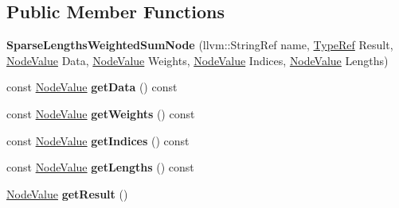 \subsection*{Public Member Functions}
\begin{DoxyCompactItemize}
\item 
\mbox{\label{classglow_1_1_sparse_lengths_weighted_sum_node_ae344f81e64ec6cc3cfde22e7eb71b1cc}} 
{\bfseries Sparse\+Lengths\+Weighted\+Sum\+Node} (llvm\+::\+String\+Ref name, \hyperlink{structglow_1_1_type}{Type\+Ref} Result, \hyperlink{structglow_1_1_node_value}{Node\+Value} Data, \hyperlink{structglow_1_1_node_value}{Node\+Value} Weights, \hyperlink{structglow_1_1_node_value}{Node\+Value} Indices, \hyperlink{structglow_1_1_node_value}{Node\+Value} Lengths)
\item 
\mbox{\label{classglow_1_1_sparse_lengths_weighted_sum_node_a0c63fad03548950fb02af05b2edfcf88}} 
const \hyperlink{structglow_1_1_node_value}{Node\+Value} {\bfseries get\+Data} () const
\item 
\mbox{\label{classglow_1_1_sparse_lengths_weighted_sum_node_ac02cd3ec5b816342c2187958937e7e0a}} 
const \hyperlink{structglow_1_1_node_value}{Node\+Value} {\bfseries get\+Weights} () const
\item 
\mbox{\label{classglow_1_1_sparse_lengths_weighted_sum_node_a0ac2414e26cde5893999cb412419b6b8}} 
const \hyperlink{structglow_1_1_node_value}{Node\+Value} {\bfseries get\+Indices} () const
\item 
\mbox{\label{classglow_1_1_sparse_lengths_weighted_sum_node_a82c9d72c94c9d73c8db27904d20f88eb}} 
const \hyperlink{structglow_1_1_node_value}{Node\+Value} {\bfseries get\+Lengths} () const
\item 
\mbox{\label{classglow_1_1_sparse_lengths_weighted_sum_node_af38308683ad88b777b4510a12ea0e8f5}} 
\hyperlink{structglow_1_1_node_value}{Node\+Value} {\bfseries get\+Result} ()
\item 
\mbox{\label{classglow_1_1_sparse_lengths_weighted_sum_node_a43cb66aeb2c646404907985c1b1d15d3}} 

\end{DoxyCompactItemize}
